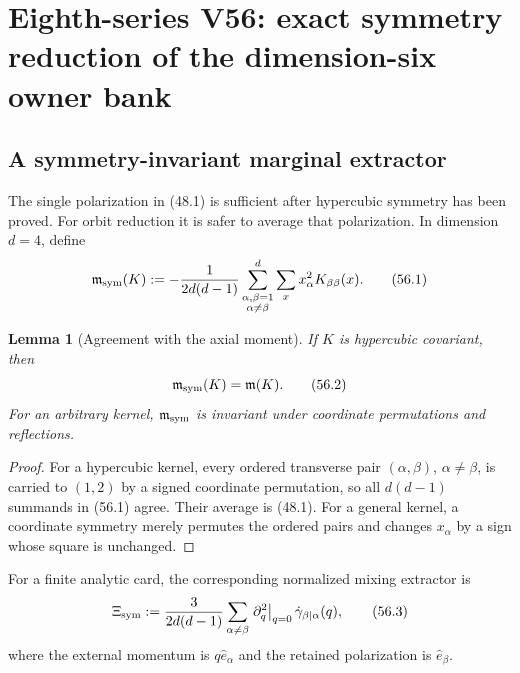 \documentclass[11pt,oneside]{book}
\newtheorem{lemma}[theorem]{Lemma}
\theoremstyle{definition}
\theoremstyle{remark}
\begin{document}


\section{Eighth-series V56: exact symmetry reduction of the
dimension-six owner bank}
\label{sec:e8v56}

\subsection{A symmetry-invariant marginal extractor}

The single polarization in (48.1) is sufficient after hypercubic
symmetry has been proved.  For orbit reduction it is safer to
average that polarization.  In dimension \(d=4\), define
\[
 {\mathfrak m}_{\rm sym}(K)
 :=-\frac1{2d(d-1)}
 \sum_{\substack{\alpha,\beta=1\\\alpha\ne\beta}}^d
 \sum_x x_\alpha^2K_{\beta\beta}(x).                          \tag{56.1}
\]

\begin{lemma}[Agreement with the axial moment]
\label{lem:e8v56-symmetric-moment}
If \(K\) is hypercubic covariant, then
\[
 {\mathfrak m}_{\rm sym}(K)={\mathfrak m}(K).                 \tag{56.2}
\]
For an arbitrary kernel, \({\mathfrak m}_{\rm sym}\) is invariant
under coordinate permutations and reflections.
\end{lemma}

\begin{proof}
For a hypercubic kernel, every ordered transverse pair
\((\alpha,\beta)\), \(\alpha\ne\beta\), is carried to
\((1,2)\) by a signed coordinate permutation, so all \(d(d-1)\)
summands in (56.1) agree.  Their average is (48.1).
For a general kernel, a coordinate symmetry merely permutes the
ordered pairs and changes \(x_\alpha\) by a sign whose square is
unchanged.
\end{proof}

For a finite analytic card, the corresponding normalized mixing
extractor is
\[
 \Xi_{\rm sym}
 :=\frac{3}{2d(d-1)}
 \sum_{\alpha\ne\beta}
 \left.\partial_q^2\right|_{q=0}
 \dot\gamma_{\beta\mid\alpha}(q),                            \tag{56.3}
\]
where the external momentum is \(q\widehat e_\alpha\) and the
retained polarization is \(\widehat e_\beta\).
\end{document}
